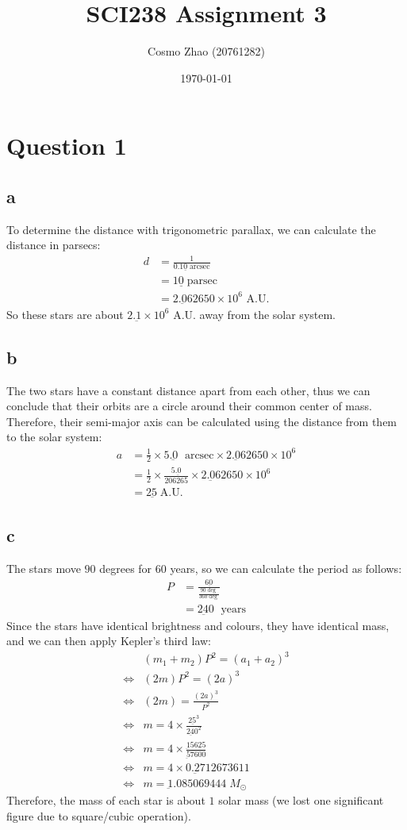 \documentclass[11pt]{article}
\title{ SCI238 Assignment 3}
\author{ Cosmo Zhao (20761282) }
\date{\today}
\newcommand{\sci}[1]{\times 10^{#1}}
\begin{document}
\maketitle
\pagebreak
\section*{Question 1}
\subsection*{a}
To determine the distance with trigonometric parallax, we can calculate the distance in parsecs:
$$
\begin{aligned}
d &= \frac{1}{0.1\underline{0} \; \text{arcsec}} \\
& = 1\underline{0} \; \text{parsec} \\
& = 2.\underbar{0}62650 \times 10^{6} \text{ A.U.}
\end{aligned}
$$ 
So these stars are about $2.\underbar{1} \sci{6}$ A.U. away from the solar system.
\subsection*{b}
The two stars have a constant distance apart from each other, 
thus we can conclude that their orbits are a circle around their common center of mass.
Therefore, their semi-major axis can be calculated using the distance from them to the solar system:
$$
\begin{aligned}
    a &= \frac{1}{2} \times 5.\underbar{0} \; \text{ arcsec} \times 2.\underbar{0}62650 \sci{6} \\
    &= \frac{1}{2} \times \frac{5.\underbar{0}}{206265} \times 2.\underbar{0}62650 \sci{6} \\
    &= 2\underbar{5} \; \text{A.U.}
\end{aligned}
$$
\subsection*{c}
The stars move $90$ degrees for $60$ years, so we can calculate the period as follows:
$$
\begin{aligned}
    P &= \frac{6\underbar{0}}{\frac{9\underbar{0} \deg}{360 \deg}}  \\
    &= 2\underbar{4}0 \; \text{ years}
\end{aligned}
$$
Since the stars have identical brightness and colours, they have identical mass, and we can then apply Kepler's third law:
$$
\begin{aligned}
    &(m_1 + m_2) P^2 = (a_1 + a_2)^3 \\
    \iff &(2m) P^2 = (2a)^3 \\
    \iff &(2m) = \frac{(2a)^3}{P^2}\\
    \iff & m = 4 \times \frac{2\underbar{5}^3}{2\underbar{4}0^2}\\
    \iff & m = 4 \times \frac{\underbar{1}5625}{\underbar{5}7600} \\
    \iff & m = 4 \times 0.\underbar{2}712673611 \\
    \iff & m = \underbar{1}.085069444 \; M_{\odot}
\end{aligned}
$$
Therefore, the mass of each star is about $1$ solar mass (we lost one significant figure due to square/cubic operation).
\end{document}
